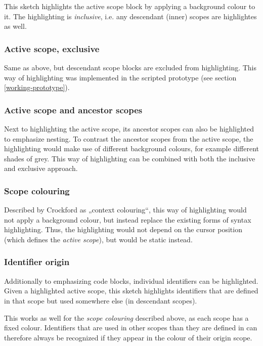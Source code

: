 This sketch highlights the active scope block by applying a background
colour to it. The highlighting is \emph{inclusive}, i.e. any descendant
(inner) scopes are highlightes as well.

\subsubsection{Active scope, exclusive}\label{active-scope-exclusive}

Same as above, but descendant scope blocks are excluded from
highlighting. This way of highlighting was implemented in the scripted
prototype (see section \ref{working-prototype}).

\subsubsection{Active scope and ancestor
scopes}\label{active-scope-and-ancestor-scopes}

Next to highlighting the active scope, its ancestor scopes can also be
highlighted to emphasize nesting. To contrast the ancestor scopes from
the active scope, the highlighting would make use of different
background colours, for example different shades of grey. This way of
highlighting can be combined with both the inclusive and exclusive
approach.

\subsubsection{Scope colouring}\label{scope-colouring}

Described by Crockford \citeyear{crockford} as „context colouring“, this
way of highlighting would not apply a background colour, but instead
replace the existing forms of syntax highlighting. Thus, the
highlighting would not depend on the cursor position (which defines the
\emph{active scope}), but would be static instead.

\subsubsection{Identifier origin}\label{identifier-origin}

Additionally to emphasizing code blocks, individual identifiers can be
highlighted. Given a highlighted active scope, this sketch highlights
identifiers that are defined in that scope but used somewhere else (in
descendant scopes).

This works as well for the \emph{scope colouring} described above, as
each scope has a fixed colour. Identifiers that are used in other scopes
than they are defined in can therefore always be recognized if they
appear in the colour of their origin scope.

